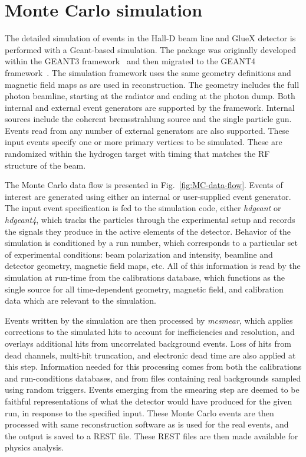 \section[Monte Carlo]{Monte Carlo simulation \label{sec:simulation}}
The detailed simulation of events in the Hall-D beam line and GlueX detector is performed with a Geant-based simulation. The package was originally developed within the GEANT3 framework~\cite{Brun:1987ma} and then migrated to the GEANT4 framework~\cite{Agostinelli:2002hh,Allison:2016lfl}. The simulation framework uses the same geometry definitions and magnetic field maps as are used in reconstruction. The geometry includes the full photon beamline, starting at the radiator and ending at the photon dump. Both internal and external event generators are supported by the framework.  Internal sources include the coherent bremsstrahlung source and the single particle gun. Events read from any number of external generators are also supported. These input events specify one or more primary vertices to be simulated. These are randomized within the hydrogen target with timing that matches the RF structure of the beam.

The Monte Carlo data flow is presented in Fig.~\ref{fig:MC-data-flow}. Events of interest are generated using either an internal or user-supplied event generator. The input event specification is fed to the simulation code, either {\em hdgeant} or {\em hdgeant4}, which tracks the particles through the experimental setup and records the signals they produce in the active elements of the detector. Behavior of the simulation is conditioned by a run number, which corresponds to a particular set of experimental conditions: beam polarization and intensity, beamline and detector geometry, magnetic field maps, etc. All of this information is read by the simulation at run-time from the calibrations database, which functions as the single source for all time-dependent geometry, magnetic field, and calibration data which are relevant to the simulation.

Events written by the simulation are then processed by \emph{ mcsmear}, which applies corrections to the simulated hits to account for inefficiencies and resolution, and overlays additional hits from uncorrelated background events. Loss of hits from dead channels, multi-hit truncation, and electronic dead time are also applied at this step. Information needed for this processing comes from both the calibrations and run-conditions databases, and from files containing real backgrounds sampled using random triggers. Events emerging from the smearing step are deemed to be faithful representations of what the detector would have produced for the given run, in response to the specified input. These Monte Carlo events are then processed with same reconstruction software as is used for the real events, and the output is saved to a REST file. These REST files are then made available for physics analysis.

